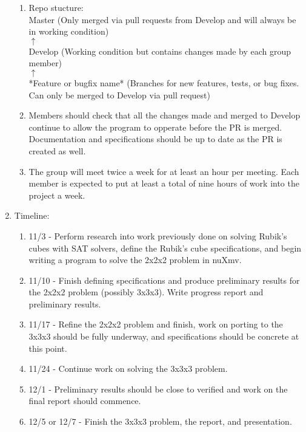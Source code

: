 \documentclass{elsarticle} %
\begin{document}
\begin{enumerate}
\begin{enumerate}
	\item Repo stucture: \\
		Master (Only merged via pull requests from Develop and will always be in working condition) \\
		\hspace*{10px} $\uparrow$ \\
 		Develop (Working condition but contains changes made by each group member) \\
 		\hspace*{10px} $\uparrow$ \\
		*Feature or bugfix name* (Branches for new features, tests, or bug fixes. Can only be merged to Develop via pull request)
	\item Members should check that all the changes made and merged to Develop continue to allow the program to opperate before the PR is merged. Documentation and specifications should be up to date as the PR is created as well.
	\item The group will meet twice a week for at least an hour per meeting. Each member is expected to put at least a total of nine hours of work into the project a week.
	\end{enumerate}
\item Timeline:
	\begin{enumerate}
	\item 11/3 - Perform research into work previously done on solving Rubik's cubes with SAT solvers, define the Rubik's cube specifications, and begin writing a program to solve the 2x2x2 problem in nuXmv.
	\item 11/10 - Finish defining specifications and produce preliminary results for the 2x2x2 problem (possibly 3x3x3). Write progress report and preliminary results.
	\item 11/17 - Refine the 2x2x2 problem and finish, work on porting to the 3x3x3 should be fully underway, and specifications should be concrete at this point.
	\item 11/24 - Continue work on solving the 3x3x3 problem.
	\item 12/1 - Preliminary results should be close to verified and work on the final report should commence.
	\item 12/5 or 12/7 - Finish the 3x3x3 problem, the report, and presentation.
	\end{enumerate}
\end{enumerate}
\end{document}

